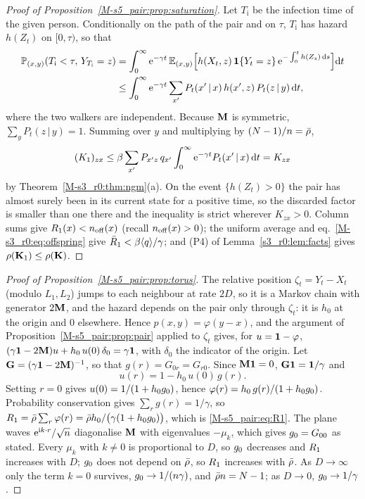 \begin{proof}[Proof of Proposition~\ref{M-s5_pair:prop:saturation}]
Let $T_{\mathrm{i}}$ be the infection time of the given person. Conditionally on the path of the pair and on
$\tau$, $T_{\mathrm{i}}$ has hazard $h(Z_t)$ on $[0,\tau)$, so that
\begin{align*}
  \mathbb{P}_{(x,y)}(T_{\mathrm{i}}<\tau,\,Y_{T_{\mathrm{i}}}=z)&=\int_0^\infty \mathrm{e}^{-\gamma t}\,
  \mathbb{E}_{(x,y)}\Bigl[h(X_t,z)\,\mathbf{1}\{Y_t=z\}\,\mathrm{e}^{-\int_0^th(Z_s)\,\mathrm{d} s}\Bigr]\mathrm{d} t\\
  &\le\int_0^\infty \mathrm{e}^{-\gamma t}\sum_{x'}P_t(x'\,|\,x)\,h(x',z)\,P_t(z\,|\,y)\,\mathrm{d} t ,
\end{align*}
where the two walkers are independent. Because $\mathbf{M}$ is symmetric, $\sum_yP_t(z\,|\,y)=1$. Summing over $y$
and multiplying by $(N-1)/n=\bar{\rho}$,
\[
  (K_1)_{zx}\le\beta\sum_{x'}P_{x'z}\,q_{x'}\int_0^\infty \mathrm{e}^{-\gamma t}P_t(x'\,|\,x)\,\mathrm{d} t=K_{zx}
\]
by Theorem~\ref{M-s3_r0:thm:ngm}(a). On the event $\{h(Z_t)>0\}$ the pair has almost surely been in its
current state for a positive time, so the discarded factor is smaller than one there and the inequality is
strict wherever $K_{zx}>0$. Column sums give $R_1(x)<n_{\mathrm{off}}(x)$ (recall $n_{\mathrm{off}}(x)>0$); the uniform average and
eq.~\eqref{M-s3_r0:eq:offspring} give $\bar{R}_1<\beta\langle q\rangle/\gamma$; and (P4) of
Lemma~\ref{s3_r0:lem:facts} gives $\rho(\mathbf{K}_1)\le\rho(\mathbf{K})$.
\end{proof}

\begin{proof}[Proof of Proposition~\ref{M-s5_pair:prop:torus}]
The relative position $\zeta_t=Y_t-X_t$ (modulo $L_1,L_2$) jumps to each neighbour at rate $2D$, so it is a
Markov chain with generator $2\mathbf{M}$, and the hazard depends on the pair only through $\zeta_t$: it is $h_0$ at
the origin and $0$ elsewhere. Hence $p(x,y)=\varphi(y-x)$, and the argument of
Proposition~\ref{M-s5_pair:prop:pair} applied to $\zeta_t$ gives, for $u=\boldsymbol{1}-\varphi$,
$(\gamma\mathbf{1}-2\mathbf{M})u+h_0\,u(0)\,\delta_0=\gamma\boldsymbol{1}$, with $\delta_0$ the indicator of the origin. Let
$\mathbf{G}=(\gamma\mathbf{1}-2\mathbf{M})^{-1}$, so that $g(r)=G_{0r}=G_{r0}$. Since $\mathbf{M}\boldsymbol{1}=0$,
$\mathbf{G}\boldsymbol{1}=\boldsymbol{1}/\gamma$ and
\[
  u(r)=1-h_0\,u(0)\,g(r).
\]
Setting $r=0$ gives $u(0)=1/(1+h_0g_0)$, hence $\varphi(r)=h_0\,g(r)/(1+h_0g_0)$. Probability conservation
gives $\sum_rg(r)=1/\gamma$, so
$R_1=\bar{\rho}\sum_r\varphi(r)=\bar{\rho} h_0/\bigl(\gamma(1+h_0g_0)\bigr)$, which is \eqref{M-s5_pair:eq:R1}. The
plane waves $\mathrm{e}^{\mathrm{i}k\cdot r}/\sqrt{n}$ diagonalise $\mathbf{M}$ with eigenvalues $-\mu_k$, which gives
$g_0=G_{00}$ as stated. Every $\mu_k$ with $k\ne0$ is proportional to $D$, so $g_0$ decreases and $R_1$
increases with $D$; $g_0$ does not depend on $\bar{\rho}$, so $R_1$ increases with $\bar{\rho}$. As $D\to\infty$
only the term $k=0$ survives, $g_0\to1/(n\gamma)$, and $\bar{\rho}n=N-1$; as $D\to0$,
$g_0\to1/\gamma$.
\end{proof}

